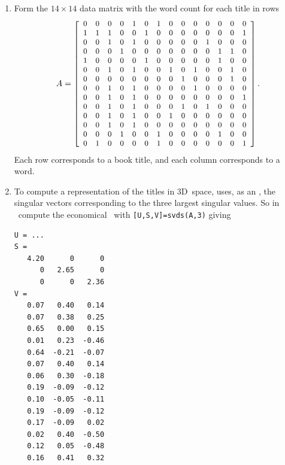 \begin{reduce}
\begin{enumerate}
\item Form the \(14\times14\) data matrix with the word count for each title in rows 
\begin{equation*}
A=\small\left[\begin{array}{*{14}c}
0&0&0&0&1&0&1&0&0&0&0&0&0&0 \\
1&1&1&0&0&1&0&0&0&0&0&0&0&1 \\
0&0&1&0&1&0&0&0&0&0&1&0&0&0 \\
0&0&0&1&0&0&0&0&0&0&0&1&1&0 \\
1&0&0&0&0&1&0&0&0&0&0&1&0&0 \\
0&0&1&0&1&0&0&1&0&1&0&0&1&0 \\
0&0&0&0&0&0&0&0&1&0&0&0&1&0 \\
0&0&1&0&1&0&0&0&0&1&0&0&0&0 \\
0&0&1&0&1&0&0&0&0&0&0&0&0&1 \\
0&0&1&0&1&0&0&0&1&0&1&0&0&0 \\
0&0&1&0&1&0&0&1&0&0&0&0&0&0 \\
0&0&1&0&1&0&0&0&0&0&0&0&0&0 \\
0&0&0&1&0&0&1&0&0&0&0&1&0&0 \\
0&1&0&0&0&0&1&0&0&0&0&0&0&1
\end{array}\right].
\end{equation*}
Each row corresponds to a book title, and each column corresponds to a word.
\setbox\ajrqrbox\hbox{}%
\marginajrbox%


\item To compute a representation of the titles in 3D~space,  uses, as an , the singular vectors corresponding to the three largest singular values.
So in \script\ compute the economical \svd\ with \verb|[U,S,V]=svds(A,3)| giving \twodp
\begin{verbatim}
U = ...
S =
   4.20      0      0
      0   2.65      0
      0      0   2.36
V =
   0.07   0.40   0.14
   0.07   0.38   0.25
   0.65   0.00   0.15
   0.01   0.23  -0.46
   0.64  -0.21  -0.07
   0.07   0.40   0.14
   0.06   0.30  -0.18
   0.19  -0.09  -0.12
   0.10  -0.05  -0.11
   0.19  -0.09  -0.12
   0.17  -0.09   0.02
   0.02   0.40  -0.50
   0.12   0.05  -0.48
   0.16   0.41   0.32
\end{verbatim}


\end{enumerate}
\end{reduce}
